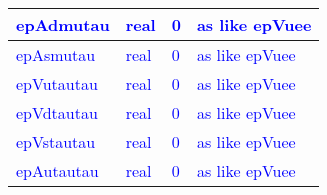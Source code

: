 \documentclass{article}
\begin{document}
\begin{longtable}{llll}
\midrule
\textcolor{blue}{epAdmutau} & \begin{minipage}[t]{2cm}\textcolor{blue}{real}\end{minipage} & \begin{minipage}[t]{2cm}\textcolor{blue}{0}\end{minipage} & \begin{minipage}[t]{12cm}\textcolor{blue}{as like epVuee}\end{minipage}\\*
\midrule
\textcolor{blue}{epAsmutau} & \begin{minipage}[t]{2cm}\textcolor{blue}{real}\end{minipage} & \begin{minipage}[t]{2cm}\textcolor{blue}{0}\end{minipage} & \begin{minipage}[t]{12cm}\textcolor{blue}{as like epVuee}\end{minipage}\\*
\midrule
\textcolor{blue}{epVutautau} & \begin{minipage}[t]{2cm}\textcolor{blue}{real}\end{minipage} & \begin{minipage}[t]{2cm}\textcolor{blue}{0}\end{minipage} & \begin{minipage}[t]{12cm}\textcolor{blue}{as like epVuee}\end{minipage}\\*
\midrule
\textcolor{blue}{epVdtautau} & \begin{minipage}[t]{2cm}\textcolor{blue}{real}\end{minipage} & \begin{minipage}[t]{2cm}\textcolor{blue}{0}\end{minipage} & \begin{minipage}[t]{12cm}\textcolor{blue}{as like epVuee}\end{minipage}\\*
\midrule
\textcolor{blue}{epVstautau} & \begin{minipage}[t]{2cm}\textcolor{blue}{real}\end{minipage} & \begin{minipage}[t]{2cm}\textcolor{blue}{0}\end{minipage} & \begin{minipage}[t]{12cm}\textcolor{blue}{as like epVuee}\end{minipage}\\*
\midrule
\textcolor{blue}{epAutautau} & \begin{minipage}[t]{2cm}\textcolor{blue}{real}\end{minipage} & \begin{minipage}[t]{2cm}\textcolor{blue}{0}\end{minipage} & \begin{minipage}[t]{12cm}\textcolor{blue}{as like epVuee}\end{minipage}\\*

\end{longtable}
\end{document}
